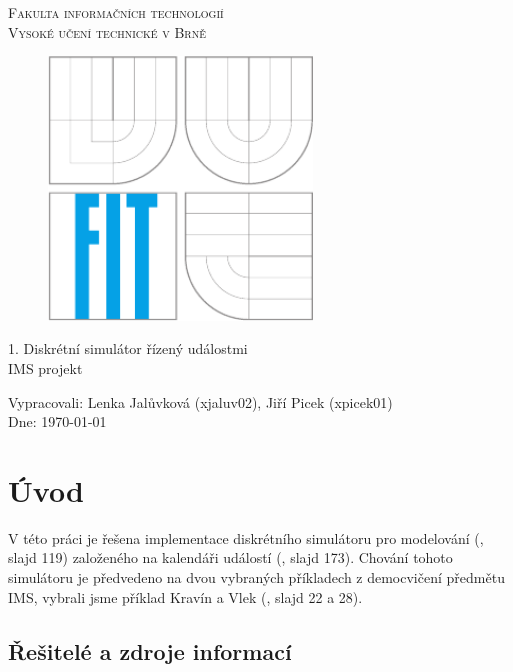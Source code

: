 \documentclass[12pt,a4paper,titlepage,final]{article}
\begin{document}
\begin{titlepage}
\begin{center}
{\Large\textsc{Fakulta informačních technologií}}\\
{\Large \textsc{Vysoké učení technické v Brně}}\\

\begin{figure}[!h]
 	\centering
	 \includegraphics[height=7cm]{fit-zp2.pdf}
\end{figure}

{\Huge 1. Diskrétní simulátor řízený událostmi}\\
\LARGE
IMS projekt\\ 
\end{center}
{\Large
Vypracovali: Lenka Jalůvková (xjaluv02), Jiří Picek (xpicek01)} \\
{\Large Dne: \today}
\end{titlepage}

\tableofcontents

\newpage
\section{Úvod} \label{uvod}

V této práci je řešena implementace diskrétního simulátoru pro modelování (\cite{peringer}, slajd 119) založeného na kalendáři událostí (\cite{peringer}, slajd 173). Chování tohoto simulátoru je předvedeno na dvou vybraných příkladech z democvičení předmětu IMS, vybrali jsme příklad Kravín a Vlek (\cite{demo1}, slajd 22 a 28).

\subsection{Řešitelé a zdroje informací}
\end{document}
